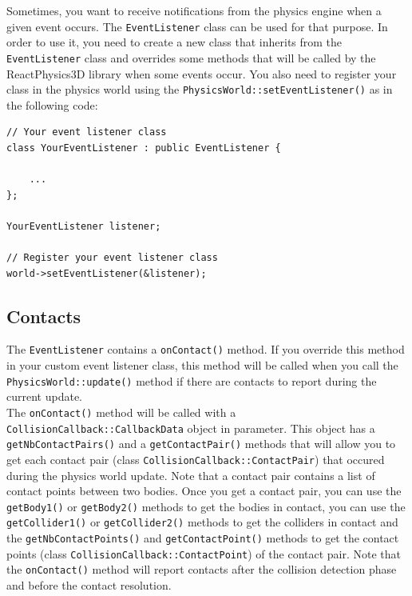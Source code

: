 \documentclass[a4paper,12pt]{article}
\begin{document}
    Sometimes, you want to receive notifications from the physics engine when a given event occurs. The \texttt{EventListener} class can be used for that
    purpose. In order to use it, you need to create a new class that inherits from the \texttt{EventListener} class and overrides some methods that will
    be called by the ReactPhysics3D library when some events occur. You also need to register your class in the physics world using the
    \texttt{PhysicsWorld::setEventListener()} as in the following code: \\

    \begin{lstlisting}
// Your event listener class
class YourEventListener : public EventListener {

	...
};

YourEventListener listener;

// Register your event listener class
world->setEventListener(&listener);
  \end{lstlisting}

    \subsection{Contacts}

    \begin{sloppypar}
    The \texttt{EventListener} contains a \texttt{onContact()} method. If you override this method in your custom event listener class, this method will
    be called when you call the \texttt{PhysicsWorld::update()} method if there are contacts to report during the current update. \\

    The \texttt{onContact()} method will be called with a \texttt{CollisionCallback::CallbackData} object in parameter. This object has a
    \texttt{getNbContactPairs()} and a \texttt{getContactPair()} methods that will allow you to get each contact pair (class
    \texttt{CollisionCallback::ContactPair}) that occured during the physics world update. Note that a contact pair contains a list of contact
    points between two bodies. Once you get a contact pair, you can use the \texttt{getBody1()} or \texttt{getBody2()} methods to get the bodies in
    contact, you can use the \texttt{getCollider1()} or \texttt{getCollider2()} methods to get the colliders in contact and the
    \texttt{getNbContactPoints()} and \texttt{getContactPoint()} methods to get the contact points (class \texttt{CollisionCallback::ContactPoint}) 
    of the contact pair. Note that the \texttt{onContact()} method will report contacts after the collision detection phase and before the contact
    resolution. \\
    \end{sloppypar}
\end{document}

